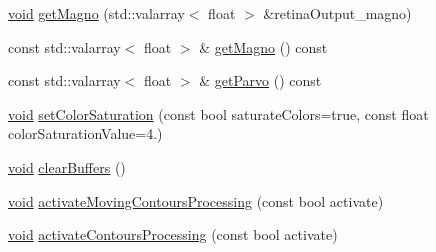 \begin{DoxyCompactItemize}
\item 
\hyperlink{legacy_8hpp_a8bb47f092d473522721002c86c13b94e}{void} \hyperlink{classcv_1_1Retina_a0741576091668b74fb4c5632725887b2}{get\-Magno} (std\-::valarray$<$ float $>$ \&retina\-Output\-\_\-magno)
\item 
const std\-::valarray$<$ float $>$ \& \hyperlink{classcv_1_1Retina_ab58166ae33c1ab898a13aaa437041b03}{get\-Magno} () const 
\item 
const std\-::valarray$<$ float $>$ \& \hyperlink{classcv_1_1Retina_af886323356193756144597e58953993d}{get\-Parvo} () const 
\item 
\hyperlink{legacy_8hpp_a8bb47f092d473522721002c86c13b94e}{void} \hyperlink{classcv_1_1Retina_a2db77e12d06dd7844aeaa5cec9a3a5ab}{set\-Color\-Saturation} (const bool saturate\-Colors=true, const float color\-Saturation\-Value=4.)
\item 
\hyperlink{legacy_8hpp_a8bb47f092d473522721002c86c13b94e}{void} \hyperlink{classcv_1_1Retina_a3f9ccc0875b12fd32a26764951bdfea6}{clear\-Buffers} ()
\item 
\hyperlink{legacy_8hpp_a8bb47f092d473522721002c86c13b94e}{void} \hyperlink{classcv_1_1Retina_a4043c09440c5680f2de0266523c68162}{activate\-Moving\-Contours\-Processing} (const bool activate)
\item 
\hyperlink{legacy_8hpp_a8bb47f092d473522721002c86c13b94e}{void} \hyperlink{classcv_1_1Retina_a7df1d093a4092f56f872fe8f19edd09e}{activate\-Contours\-Processing} (const bool activate)
\end{DoxyCompactItemize}
